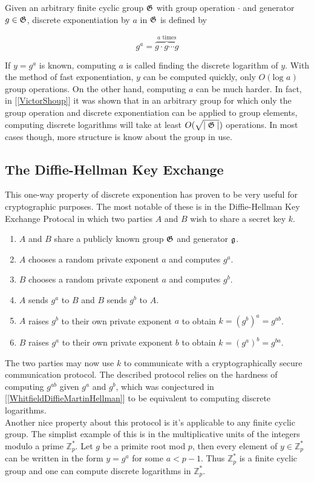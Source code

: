 Given an arbitrary finite cyclic group $\mathfrak{G}$ with group operation $\cdot$ and generator $g \in \mathfrak{G}$, discrete exponentiation by $a$ in $\mathfrak{G}$ is defined by 

$$
g^a = \overbrace{g \cdot g \cdots g}^{a \text{ times}}
$$

If $y = g^a$ is known, computing $a$ is called finding the discrete logarithm of $y$. With the method of fast exponentiation, $y$ can be computed quickly, only $O(\text{log } a)$ group operations. On the other hand, computing $a$ can be much harder. In fact, in [\ref{VictorShoup}] it was shown that in an arbitrary group for which only the group operation and discrete exponentiation can be applied to group elements, computing discrete logarithms will take at least $O(\sqrt{\mid \mathfrak{G} \mid})$ operations. In most cases though, more structure is know about the group in use. 

\subsection{The Diffie-Hellman Key Exchange}

This one-way property of discrete exponention has proven to be very useful for cryptographic purposes. The most notable of these is in the Diffie-Hellman Key Exchange Protocal in which two parties $A$ and $B$ wish to share a secret key $k$. 

\begin{enumerate}[1.]
	\item $A$ and $B$ share a publicly known group $\mathfrak{G}$ and generator $\mathfrak{g}$. 
	\item $A$ chooses a random private exponent $a$ and computes $g^a$.
	\item $B$ chooses a random private exponent $a$ and computes $g^b$.
	\item $A$ sends $g^a$ to $B$ and $B$ sends $g^b$ to $A$. 
	\item $A$ raises $g^b$ to their own private exponent $a$ to obtain $k = (g^b)^a = g^{ab}$.
	\item $B$ raises $g^a$ to their own private exponent $b$ to obtain $k = (g^a)^b = g^{ba}$.
\end{enumerate}

The two parties may now use $k$ to communicate with a cryptographically secure communication protocol. The described protocol relies on the hardness of computing $g^{ab}$ given $g^a$ and $g^b$, which was conjectured in [\ref{WhitfieldDiffieMartinHellman}] to be equivalent to computing discrete logarithms. \\ 

Another nice property about this protocol is it's applicable to any finite cyclic group. The simplist example of this is in the multiplicative units of the integers modulo a prime $\mathbb{Z}_p^*$. Let $g$ be a primite root mod $p$, then every element of $y \in \mathbb{Z}_p^*$ can be written in the form $y = g^a$ for some $a < p-1$. Thus $\mathbb{Z}_p^*$ is a finite cyclic group and one can compute discrete logarithms in $\mathbb{Z}_p^*$. 





